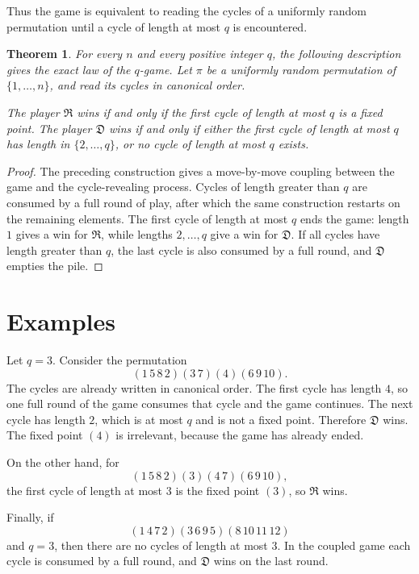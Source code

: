 \documentclass{article}
\newcommand{\Rplayer}{\mathfrak{R}}
\newcommand{\Dplayer}{\mathfrak{D}}
\newtheorem{theorem}{Theorem}
\begin{document}
Thus the game is equivalent to reading the cycles of a uniformly random
permutation until a cycle of length at most $q$ is encountered.

\begin{theorem}
\label{thm:main-coupling}
For every $n$ and every positive integer $q$, the following description gives
the exact law of the $q$-game. Let $\pi$ be a uniformly random permutation of
$\{1,\ldots,n\}$, and read its cycles in canonical order.

The player $\Rplayer$ wins if and only if the first cycle of length at most
$q$ is a fixed point. The player $\Dplayer$ wins if and only if either the
first cycle of length at most $q$ has length in $\{2,\ldots,q\}$, or no cycle
of length at most $q$ exists.
\end{theorem}

\begin{proof}
The preceding construction gives a move-by-move coupling between the game and
the cycle-revealing process. Cycles of length greater than $q$ are consumed by
a full round of play, after which the same construction restarts on the
remaining elements. The first cycle of length at most $q$ ends the game:
length $1$ gives a win for $\Rplayer$, while lengths $2,\ldots,q$ give a win
for $\Dplayer$. If all cycles have length greater than $q$, the last cycle is
also consumed by a full round, and $\Dplayer$ empties the pile.
\end{proof}

\section{Examples}

Let $q=3$. Consider the permutation
\[
    (1\,5\,8\,2)(3\,7)(4)(6\,9\,10).
\]
The cycles are already written in canonical order. The first cycle has length
$4$, so one full round of the game consumes that cycle and the game continues.
The next cycle has length $2$, which is at most $q$ and is not a fixed point.
Therefore $\Dplayer$ wins. The fixed point $(4)$ is irrelevant, because the
game has already ended.

On the other hand, for
\[
    (1\,5\,8\,2)(3)(4\,7)(6\,9\,10),
\]
the first cycle of length at most $3$ is the fixed point $(3)$, so
$\Rplayer$ wins.

Finally, if
\[
    (1\,4\,7\,2)(3\,6\,9\,5)(8\,10\,11\,12)
\]
and $q=3$, then there are no cycles of length at most $3$. In the coupled
game each cycle is consumed by a full round, and $\Dplayer$ wins on the last
round.
\end{document}
